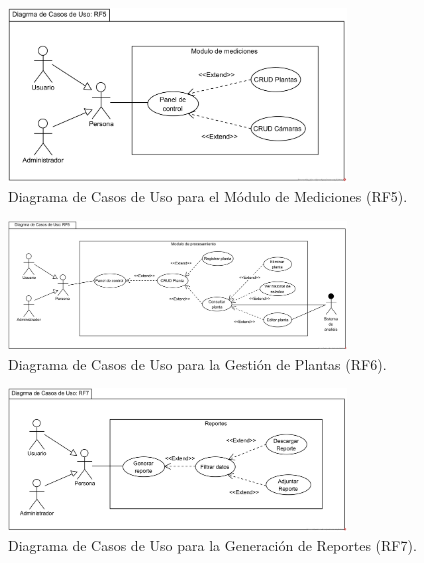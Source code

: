 \begin{figure}[H]
    \centering
    \caption{Diagrama de Casos de Uso para el Módulo de Mediciones (RF5).}
    \label{fig:casos-uso-mediciones}
    \includegraphics[width=0.8\textwidth]{UML/CasosUso/Diagrama de Casos de Uso RF5.png}
\end{figure}


\begin{figure}[H]
    \centering
    \caption{Diagrama de Casos de Uso para la Gestión de Plantas (RF6).}
    \label{fig:casos-uso-plantas}
    \includegraphics[width=0.8\textwidth]{UML/CasosUso/Diagrama de Casos de Uso RF6.png}
\end{figure}


\begin{figure}[H]
    \centering
    \caption{Diagrama de Casos de Uso para la Generación de Reportes (RF7).}
    \label{fig:casos-uso-reportes}
     \includegraphics[width=0.8\textwidth]{UML/CasosUso/Diagrama de Casos de Uso RF7.png}
\end{figure}


